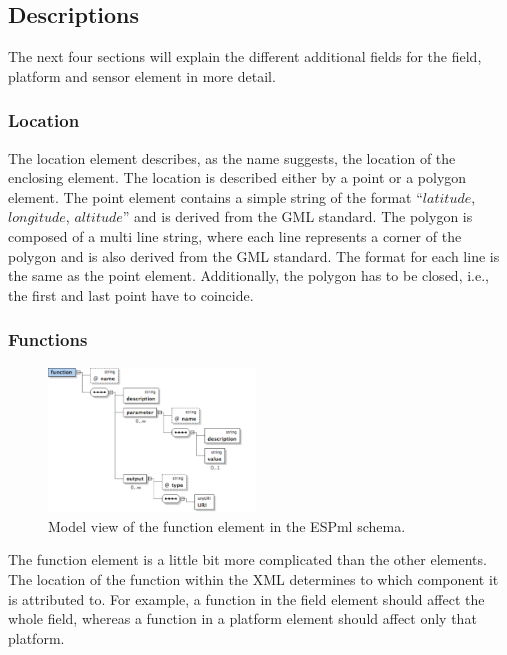 \subsection{Descriptions}
The next four sections will explain the different additional fields
for the field, platform and sensor element in more detail. 

\subsubsection{Location}\label{sec:location}
The location element describes, as the name suggests, the location of
the enclosing element. The location is described either by a point or
a polygon element. The point element contains a simple string of the
format ``$latitude$, $longitude$, $altitude$'' and is derived from the
GML standard. The polygon is composed of a multi line string, where
each line represents a corner of the polygon and is also derived from
the GML standard. The format for each line is the same as the point
element. Additionally, the polygon has to be closed, i.e., the first
and last point have to coincide.

\subsubsection{Functions}\label{sec:function}
\begin{figure}[t]
  \begin{center}
    \includegraphics[width=0.49\textwidth]{images/function}
    \caption{Model view of the function element in the ESPml schema.}
    \label{fig:function}
  \end{center}
\end{figure}
The function element is a little bit more complicated than the other
elements.  The location of the function within the XML determines to
which component it is attributed to. For example, a function in the field
element should affect the whole field, whereas a function in a
platform element should affect only that platform.


